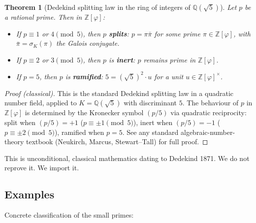 \documentclass[11pt,a4paper]{article}
\newtheorem{theorem}{Theorem}
\theoremstyle{definition}
\theoremstyle{remark}
\begin{document}
\begin{theorem}[Dedekind splitting law in the ring of integers of $\mathbb{Q}(\sqrt{5})$]\label{thm:dedekind}
Let $p$ be a rational prime. Then in $\mathbb{Z}[\varphi]$:
\begin{itemize}\itemsep0pt
  \item If $p \equiv 1$ or $4 \pmod{5}$, then $p$ \textbf{splits}:
    $p = \pi \bar{\pi}$ for some prime $\pi \in \mathbb{Z}[\varphi]$,
    with $\bar{\pi} = \sigma_K(\pi)$ the Galois conjugate.
  \item If $p \equiv 2$ or $3 \pmod{5}$, then $p$ is \textbf{inert}:
    $p$ remains prime in $\mathbb{Z}[\varphi]$.
  \item If $p = 5$, then $p$ is \textbf{ramified}:
    $5 = (\sqrt{5})^2 \cdot u$ for a unit $u \in \mathbb{Z}[\varphi]^\times$.
\end{itemize}
\end{theorem}

\begin{proof}[Proof (classical)]
This is the standard Dedekind splitting law in a quadratic number field,
applied to $K = \mathbb{Q}(\sqrt{5})$ with discriminant $5$. The
behaviour of $p$ in $\mathbb{Z}[\varphi]$ is determined by the Kronecker
symbol $(p/5)$ via quadratic reciprocity: split when $(p/5) = +1$
($p \equiv \pm 1 \pmod{5}$), inert when $(p/5) = -1$ ($p \equiv \pm 2 \pmod{5}$),
ramified when $p = 5$. See any standard algebraic-number-theory textbook
(Neukirch, Marcus, Stewart--Tall) for full proof.
\end{proof}

This is unconditional, classical mathematics dating to Dedekind 1871. We
do not reprove it. We import it.

\subsection{Examples}\label{ssec:examples}

Concrete classification of the small primes:
\end{document}
